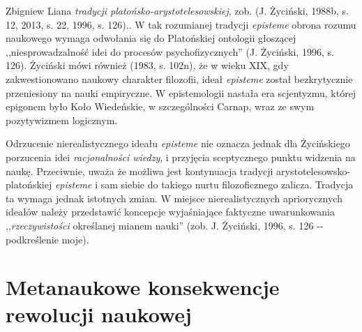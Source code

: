 \begin{artplenv}{Zbigniew Liana}
{\textit{tradycji platońsko-arystotelesowskiej}, zob. \label{ref:RND3PMPQPUS6i}(J. Życiński, 1988b, s. 12, 2013, s. 22,
1996, s. 126).}. W tak rozumianej tradycji \textit{episteme} obrona rozumu naukowego wymaga odwołania się do Platońskiej
ontologii głoszącej ,,niesprowadzalność idei do procesów psychofizycznych'' \label{ref:RNDhHlzendpnr}(J. Życiński, 1996,
s. 126). Życiński mówi również \label{ref:RNDynpLuVGokl}(1983, s. 102n), że w wieku XIX, gdy zakwestionowano naukowy
charakter filozofii, ideał \textit{episteme} został bezkrytycznie przeniesiony na nauki empiryczne. W epistemologii
nastała era scjentyzmu, której epigonem było Koło Wiedeńskie, w szczególności Carnap, wraz ze swym pozytywizmem
logicznym.

Odrzucenie nierealistycznego ideału \textit{episteme} nie oznacza jednak dla Życińskiego porzucenia idei
\textit{racjonalności wiedzy}, i przyjęcia sceptycznego punktu widzenia na naukę. Przeciwnie, uważa że możliwa jest
kontynuacja tradycji arystotelesowsko-platońskiej \textit{episteme} i sam siebie do takiego nurtu filozoficznego zalicza.
Tradycja ta wymaga jednak istotnych zmian. W miejsce nierealistycznych apriorycznych ideałów należy przedstawić
koncepcje wyjaśniające faktyczne uwarunkowania ,,\textit{rzeczywistości} określanej mianem nauki''
\label{ref:RNDDRndo6NuDC}(zob. J. Życiński, 1996, s. 126 -{}- podkreślenie moje).

\section{Metanaukowe konsekwencje rewolucji naukowej}


\end{artplenv}
